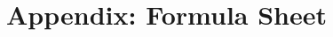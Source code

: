 \documentclass{book}
\newcommand{\comment}[1]{} %
\begin{document}
\appendix
\chapter{Appendix: Formula Sheet} \label{ch:formula_sheet}
    

\comment{
\chapter{Non-Formula Sheet} \label{ch:non_formula_sheet}
    
}

\printnoidxglossary
\end{document}
